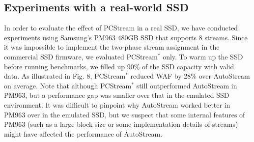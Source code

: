 \vspace{-8pt}
\subsection{Experiments with a real-world SSD}
\vspace{-2pt}

In order to evaluate the effect of \textsf{\small PCStream} in a real SSD,  
we have
conducted experiments using Samsung's PM963 480GB SSD that supports 8 streams.
Since it was impossible to implement the two-phase stream assignment in the
commercial SSD firmware, we evaluated \textsf{\small PCStream$^*$} only.  To warm up the
SSD before running benchmarks, we filled up 90\% of the SSD capacity with valid
data.
As illustrated in Fig. 8, \textsf{\small PCStream$^*$} reduced WAF by
28\% over \textsf{\small AutoStream} on average.  
Note that although \textsf{\small PCStream$^*$} still outperformed \textsf{\small AutoStream} in PM963, 
but a performance gap was smaller over that
in the emulated SSD environment.  It was difficult to pinpoint why
\textsf{\small AutoStream} worked better in PM963 over in the emulated SSD, but we
suspect that some internal features of PM963 (such as a large block size or some implementation details of streams) %
might have affected the performance of \textsf{\small AutoStream}.

